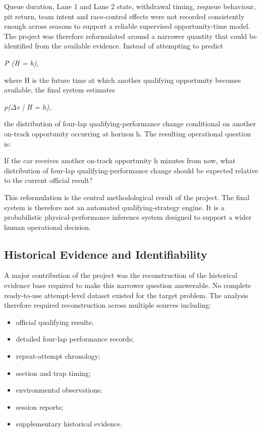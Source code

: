 Queue duration, Lane 1 and Lane 2 state, withdrawal timing, requeue behaviour, pit return, team intent and race-control effects were not recorded consistently enough across seasons to support a reliable supervised opportunity-time model. The project was therefore reformulated around a narrower quantity that could be identified from the available evidence. Instead of attempting to predict

\begin{center}\textit{P (H = h),}\end{center}

where H is the future time at which another qualifying opportunity becomes available, the final system estimates

\begin{center}\textit{p(\ensuremath{\Delta}v | H = h),}\end{center}

the distribution of four-lap qualifying-performance change conditional on another on-track opportunity occurring at horizon h. The resulting operational question is:

If the car receives another on-track opportunity h minutes from now, what distribution of four-lap qualifying-performance change should be expected relative to the current official result?

This reformulation is the central methodological result of the project. The final system is therefore not an automated qualifying-strategy engine. It is a probabilistic physical-performance inference system designed to support a wider human operational decision.

\subsection{Historical Evidence and Identifiability}
A major contribution of the project was the reconstruction of the historical evidence base required to make this narrower question answerable. No complete ready-to-use attempt-level dataset existed for the target problem. The analysis therefore required reconstruction across multiple sources including:

\begin{itemize}
\item official qualifying results;
\item detailed four-lap performance records;
\item repeat-attempt chronology;
\item section and trap timing;
\item environmental observations;
\item session reports;
\item supplementary historical evidence.
\end{itemize}

